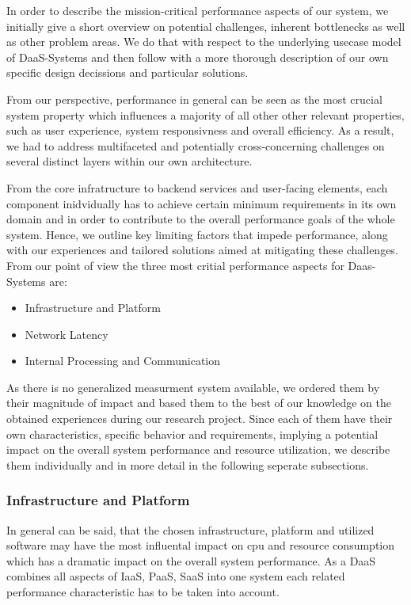 \documentclass[runningheads]{llncs}
\begin{document}
In order to describe the mission-critical performance aspects of our system,
we initially give a short overview on potential challenges,
inherent bottlenecks as well as other problem areas.
We do that with respect to the underlying usecase model of DaaS-Systems
and then follow with a more thorough description
of our own specific design decissions and particular solutions.

From our perspective, performance in general can be seen as the most crucial system property
which influences a majority of all other other relevant properties,
such as user experience, system responsivness and overall efficiency.
As a result, we had to address multifaceted
and potentially cross-concerning challenges
on several distinct layers within our own architecture.

From the core infratructure to backend services
and user-facing elements, each component inidvidually
has to achieve certain minimum requirements in its own domain
and in order to contribute to the overall performance goals of the whole system.
Hence, we outline key limiting factors that impede performance,
along with our experiences and tailored solutions
aimed at mitigating these challenges.
From our point of view the three most critial performance aspects
for Daas-Systems are:
\begin{itemize}
	\item Infrastructure and Platform
	\item Network Latency
	\item Internal Processing and Communication
\end{itemize}
As there is no generalized measurment system available,
we ordered them by their magnitude of impact
and based them to the best of our knowledge
on the obtained experiences during our research project.
Since each of them have their own characteristics,
specific behavior and requirements, implying a potential impact
on the overall system performance and resource utilization,
we describe them individually and in more detail
in the following seperate subsections.

\subsubsection{Infrastructure and Platform}
In general can be said, that the chosen infrastructure, platform and utilized software
may have the most influental impact on cpu and resource consumption
which has a dramatic impact on the overall system performance.
As a DaaS combines all aspects of IaaS, PaaS, SaaS into one system
each related performance characteristic has to be taken into account.
\end{document}
